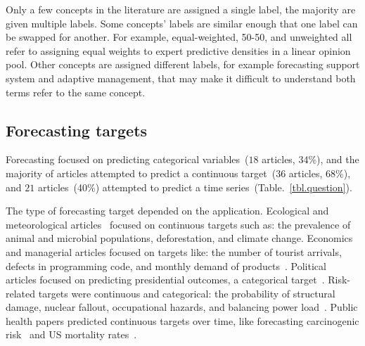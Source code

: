 \documentclass[preprint]{elsarticle}
\begin{document}
Only a few concepts in the literature are assigned a single label, the majority are given multiple labels.
Some concepts' labels are similar enough that one label can be swapped for another.
For example, equal-weighted, 50-50, and unweighted all refer to assigning equal weights to expert predictive densities in a linear opinion pool. 
Other concepts are assigned different labels, for example forecasting support system and adaptive management, that may make it difficult to understand both terms refer to the same concept.

\subsection{Forecasting targets}

Forecasting focused on predicting categorical variables~($18$ articles, 34\%), and
the majority of articles attempted to predict a continuous target~($36$ articles, $68$\%), and $21$ articles~(40\%) attempted to predict a time series~(Table.~\ref{tbl.question}).

The type of forecasting target depended on the application.
Ecological and meteorological articles~\cite{johnson2018making,cooke2014out,li2012preliminary,tartakovsky2007probabilistic,morales2017characterization,borsuk2004predictive,abramson1996hailfinder,mantyka2014understanding,kurowicka2010probabilistic,wang2018bayesian} focused on continuous targets such as: the prevalence of animal and microbial populations, deforestation, and climate change.
Economics and managerial articles focused on targets like: the number of tourist arrivals, defects in programming code, and monthly demand of products~\cite{song2013combining,kabak2008aggregating,huang2016improving,failing2004using,shin2013robust}.
Political articles focused on predicting presidential outcomes, a categorical target~\cite{hurley2002combining,graefe2014accuracy,morgan2014use,graefe2015accuracy,graefe2018predicting,graefe2014combining}.
Risk-related targets were continuous and categorical: the probability of structural damage, nuclear fallout, occupational hazards, and balancing power load~\cite{klas2010support,zio1997accounting,cabello2012combination,adams2009acceptability,neves2008life,jana2019interval,hathout2016uncertainty,wang2008probabilistic,ren2002optimal,zio1996use,baecke2017investigating,brito2016bayesian,craig2001bayesian,mu1999multi,brito2012behavioral}.
Public health papers predicted continuous targets over time, like forecasting carcinogenic risk~\cite{evans1994use} and US mortality rates~\cite{alho1992estimating}.
\end{document}
